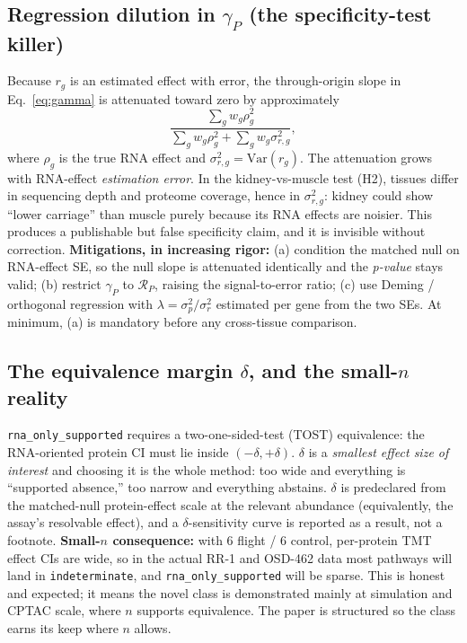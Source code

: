 \documentclass[11pt]{article}
\newcommand{\Crna}{\texttt{rna\_only\_supported}}
\newcommand{\Cind}{\texttt{indeterminate}}
\begin{document}
\subsection{Regression dilution in $\gamma_P$ (the specificity-test killer)}\label{sec:dilution}
Because $r_g$ is an estimated effect with error, the through-origin slope in Eq.~\eqref{eq:gamma} is
attenuated toward zero by approximately
\[
\frac{\sum_g w_g \rho_g^2}{\sum_g w_g \rho_g^2 + \sum_g w_g \sigma_{r,g}^2},
\]
where $\rho_g$ is the true RNA effect and $\sigma_{r,g}^2=\mathrm{Var}(r_g)$. The attenuation grows with
RNA-effect \emph{estimation error}. In the kidney-vs-muscle test (H2), tissues differ in sequencing depth
and proteome coverage, hence in $\sigma_{r,g}^2$: kidney could show ``lower carriage'' than muscle purely
because its RNA effects are noisier. This produces a publishable but false specificity claim, and it is
invisible without correction. \textbf{Mitigations, in increasing rigor:}
(a) condition the matched null on RNA-effect SE, so the null slope is attenuated identically and the
\emph{p-value} stays valid; (b) restrict $\gamma_P$ to $\mathcal{R}_P$, raising the signal-to-error ratio;
(c) use Deming / orthogonal regression with $\lambda=\sigma_p^2/\sigma_r^2$ estimated per gene from the two
SEs. At minimum, (a) is mandatory before any cross-tissue comparison.

\subsection{The equivalence margin $\delta$, and the small-$n$ reality}\label{sec:delta}
\Crna{} requires a two-one-sided-test (TOST) equivalence: the RNA-oriented protein CI must lie inside
$(-\delta,+\delta)$. $\delta$ is a \emph{smallest effect size of interest} and choosing it is the whole
method: too wide and everything is ``supported absence,'' too narrow and everything abstains. $\delta$ is
predeclared from the matched-null protein-effect scale at the relevant abundance (equivalently, the assay's
resolvable effect), and a $\delta$-sensitivity curve is reported as a result, not a footnote. \textbf{Small-$n$
consequence:} with $6$ flight / $6$ control, per-protein TMT effect CIs are wide, so in the actual RR-1 and
OSD-462 data most pathways will land in \Cind{}, and \Crna{} will be sparse. This is honest and expected;
it means the novel class is demonstrated mainly at simulation and CPTAC scale, where $n$ supports
equivalence. The paper is structured so the class earns its keep where $n$ allows.
\end{document}
